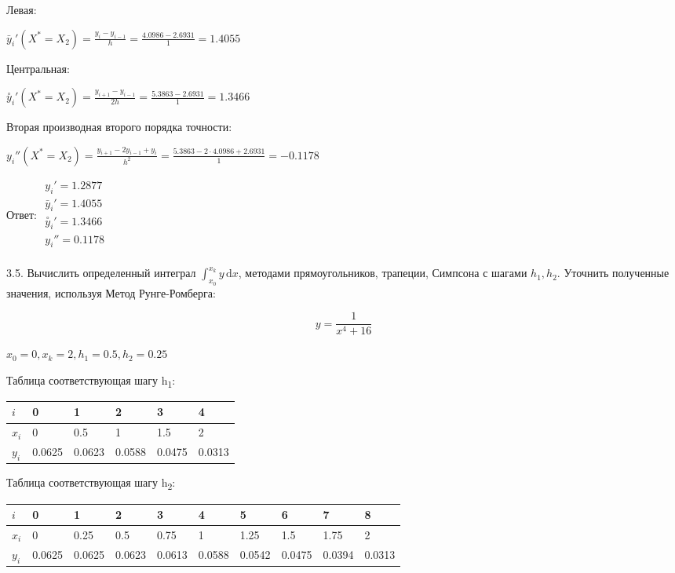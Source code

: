 \documentclass[10pt, a4paper]{scrartcl}
\begin{document}
Левая:

\(\displaystyle \bar{y}_i'(X^*=X_2) = \frac{y_{i} - y_{i-1}}{h} = \frac{4.0986 - 2.6931}{1} = 1.4055\)

Центральная:

\(\displaystyle \overset{\circ}{y}_i'(X^*=X_2) = \frac{y_{i+1} - y_{i-1}}{2h} = \frac{5.3863 - 2.6931}{1} = 1.3466\)

Вторая производная второго порядка точности:

\(\displaystyle y_i''(X^*=X_2) = \frac{y_{i+1} - 2y_{i-1} + y_{i}}{h^2} = \frac{5.3863 - 2\cdot 4.0986 + 2.6931}{1} = -0.1178\)

\vspace{5mm}

Ответ:
\(\displaystyle \begin{array}{l} y_i' = 1.2877\\ \bar{y}_i' = 1.4055\\ \overset{\circ}{y}_i' = 1.3466\\ y_i'' = 0.1178\\ \end{array}\)

\pagebreak

3.5. Вычислить определенный интеграл
\(\displaystyle \int_{x_0}^{x_k} y\,\mathrm{d}x\), методами
прямоугольников, трапеции, Симпсона с шагами \(h_1, h_2\). Уточнить
полученные значения, используя Метод Рунге-Ромберга:

\[y = \frac{1}{x^4 + 16}\]

\(\displaystyle x_0 = 0, x_k = 2, h_1 = 0.5, h_2 = 0.25\)

\vspace{5mm}

Таблица соответствующая шагу h\textsubscript{1}:

\begin{center}
\begin{tabular}{ | l  | l  | l  | l  | l  | l |}
\hline
$i$ & 0 & 1 & 2 & 3 & 4 \\ \hline
$x_i$ & 0 & 0.5 & 1 & 1.5 & 2 \\ \hline
$y_i$ & 0.0625 & 0.0623 & 0.0588 & 0.0475 & 0.0313 \\ \hline
\end{tabular}
\end{center}

Таблица соответствующая шагу h\textsubscript{2}:

\begin{center}
\begin{tabular}{ | l  | l  | l  | l  | l  | l  | l  | l  | l  | l |}
\hline
$i$ & 0 & 1 & 2 & 3 & 4 & 5 & 6 & 7 & 8 \\ \hline
$x_i$ & 0 & 0.25 & 0.5 & 0.75 & 1 & 1.25 & 1.5 & 1.75 & 2 \\ \hline
$y_i$ & 0.0625 & 0.0625 & 0.0623 & 0.0613 & 0.0588 & 0.0542 & 0.0475 & 0.0394 & 0.0313 \\ \hline
\end{tabular}
\end{center}
\end{document}
